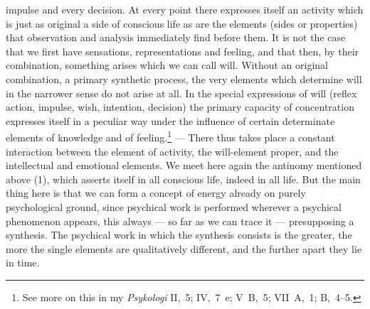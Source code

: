 \documentclass[12pt,a4paper]{book}
\newcommand{\opage}[1]{\marginnote{\footnotesize\textit{[#1]}}}
\begin{document}
impulse and every decision. At every point there expresses itself an activity
which is just as original a side of conscious life as are the elements (sides or
properties) that observation and analysis immediately find before them. It is
not the case that we first have sensations, representations and feeling, and
that then, by their combination, something arises which we can call will.
Without an original combination, a primary synthetic process, the very elements
which determine will in the narrower sense do not arise at all. In the special
expressions of will (reflex action, impulse, wish, intention, decision) the
primary capacity of concentration expresses itself in a peculiar way under the
influence of certain determinate elements of knowledge and of
feeling.\footnote{See more on this in my \textit{Psykologi} II,~5; IV,~7~e;
V~B,~5; VII~A,~1; B,~4--5.} --- There thus takes place a constant interaction
between \opage{27}the element of activity, the will-element proper, and the intellectual
and emotional elements. We meet here again the antinomy mentioned above (1),
which asserts itself in all conscious life, indeed in all life. But the main
thing here is that we can form a concept of energy already on purely
psychological ground, since psychical work is performed wherever a psychical
phenomenon appears, this always --- so far as we can trace it ---
presupposing a synthesis. The psychical work in which the synthesis consists is
the greater, the more the single elements are qualitatively different, and the
further apart they lie in time.
\end{document}
